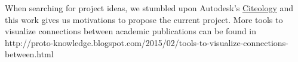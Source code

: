 When searching for project ideas, we stumbled upon Autodesk's \href{http://www.autodeskresearch.com/projects/citeology}{Citeology} and this work gives us motivations to propose the current project. More tools to visualize connections between academic publications can be found in http://proto-knowledge.blogspot.com/2015/02/tools-to-visualize-connections-between.html